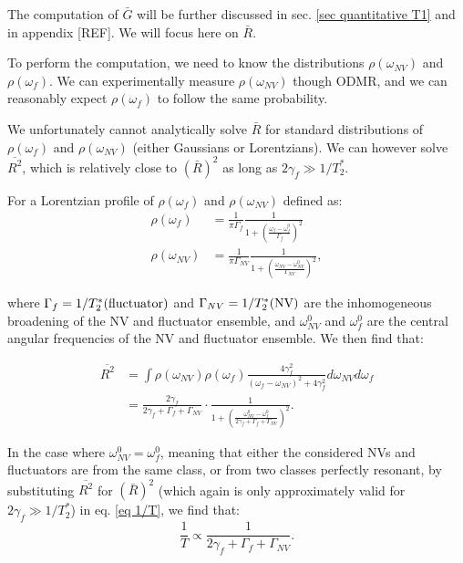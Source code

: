 \documentclass[a4paper,11pt]{report}
\begin{document}
\begin{refsection}
The computation of $\bar G$ will be further discussed in sec. \ref{sec quantitative T1} and in appendix [REF]. We will focus here on $\bar R$.

To perform the computation, we need to know the distributions $\rho(\omega_{NV})$ and $\rho(\omega_{f})$. We can experimentally measure $\rho(\omega_{NV})$ though ODMR, and we can reasonably expect $\rho(\omega_{f})$ to follow the same probability.

We unfortunately cannot analytically solve $\bar R$ for standard distributions of $\rho(\omega_{f})$ and $\rho(\omega_{NV})$ (either Gaussians or Lorentzians). We can however solve $\overline{R^2}$, which is relatively close to $(\bar{R})^2$ as long as $2 \gamma_f \gg 1/T_2^*$.

For a Lorentzian profile of $\rho(\omega_{f})$ and $\rho(\omega_{NV})$ defined as:
\begin{align*}
\rho(\omega_{f})&=\frac{1}{\pi \Gamma_f} \frac{1}{1+ \left(\frac{\omega_f-\omega^0_f}{\Gamma_f}\right)^2} \\
\rho(\omega_{NV})&=\frac{1}{\pi \Gamma_{NV}} \frac{1}{1+ \left(\frac{\omega_{NV}-\omega^0_{NV}}{\Gamma_{NV}}\right)^2},
\end{align*}

where $\Gamma_{f}=1/T_2^*(\rm fluctuator)$ and $\Gamma_{NV}=1/T_2^*(\rm NV)$ are the inhomogeneous broadening of the NV and fluctuator ensemble, and $\omega^0_{NV}$ and $\omega^0_{f}$ are the central angular frequencies of the NV and fluctuator ensemble. We then find that:

\begin{align*}
\overline{R^2}&= \int \rho(\omega_{NV}) \rho(\omega_{f}) \frac{4\gamma_f^2}{(\omega_f - \omega_{NV})^2+4\gamma_f^2} d\omega_{NV} d\omega_{f} \\
&=\frac{2 \gamma_f}{2 \gamma_f + \Gamma_f + \Gamma_{NV}} \cdot \frac{1}{1+\left(\frac{\omega^0_{NV}-\omega^0_{f}}{2 \gamma_f + \Gamma_f + \Gamma_{NV}}\right)^2}.
\end{align*}

In the case where $\omega^0_{NV}=\omega^0_{f}$, meaning that either the considered NVs and fluctuators are from the same class, or from two classes perfectly resonant, by substituting $\overline{R ^2}$ for $(\bar{R})^2$ (which again is only approximately valid for $2 \gamma_f \gg 1/T_2^*$) in eq. \ref{eq 1/T}, we find that:
\begin{equation}
\label{eq 1/T avec T2*}
\frac{1}{T} \propto \frac{1}{2\gamma_f + \Gamma_f + \Gamma_{NV}}.
\end{equation}


\end{refsection}
\end{document}
